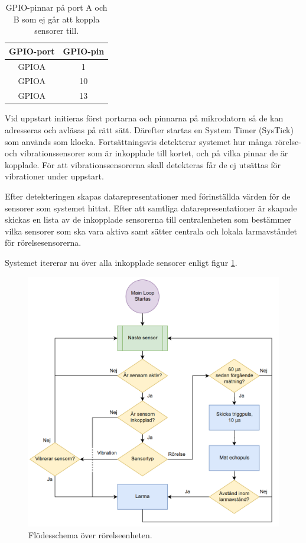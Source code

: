 \documentclass{article}
\begin{document}
\begin{table}[htbp]
	\centering
	\begin{tabular}{|c|c|} \hline
		GPIO-port & GPIO-pin \\ \hline \hline
		GPIOA & 1 \\ \hline
		GPIOA & 10 \\ \hline
		GPIOA & 13 \\ \hline
	\end{tabular}
	\caption{GPIO-pinnar på port A och B som ej går att koppla sensorer till.}
	\label{tab:Ogiltliga pinnar}
\end{table}

Vid uppstart initieras först portarna och pinnarna på mikrodatorn så de kan adresseras och avläsas på rätt sätt. Därefter startas en System Timer (SysTick) som används som klocka.
Fortsättningsvis detekterar systemet hur många rörelse- och vibrationssensorer som är inkopplade till kortet, och på vilka pinnar de är kopplade. För att vibrationssensorerna skall detekteras får de ej utsättas för vibrationer under uppstart.

Efter detekteringen skapas datarepresentationer med förinställda värden för de
sensorer som systemet hittat. Efter att samtliga datarepresentationer är skapade skickas
en lista av de inkopplade sensorerna till centralenheten som bestämmer vilka sensorer som ska vara aktiva
samt sätter centrala och lokala larmavståndet för rörelsesensorerna.

\begin{flushleft}
Systemet itererar nu över alla inkopplade sensorer enligt figur \ref{fig:MotionFlow}. \linebreak \newline
\end{flushleft}

\begin{figure}
\centering
\includegraphics[scale=0.3]{figurer/FlowchartMotion.png}
\caption{Flödesschema över rörelseenheten.}
 \label{fig:MotionFlow}
\end{figure}
\end{document}
